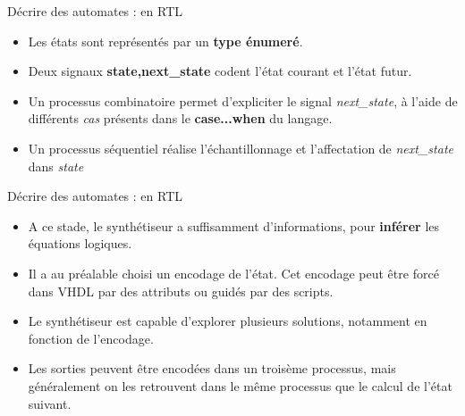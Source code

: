 \begin{frame}{Décrire des automates : en RTL}
  \begin{itemize}
    \item Les états sont représentés par un \textbf{type énumeré}.
    \item Deux signaux \textbf{state,next\_state} codent l'état courant et l'état futur.
    \item Un processus combinatoire permet d'expliciter le signal {\it next\_state}, à l'aide
    de différents {\it cas} présents dans le \textbf{case...when} du langage.
    \item Un processus séquentiel réalise l'échantillonnage et l'affectation de {\it next\_state} dans {\it state}
  \end{itemize}
\end{frame}

\begin{frame}{Décrire des automates : en RTL}
  \begin{itemize}
    \item A ce stade, le synthétiseur a suffisamment d'informations, pour \textbf{inférer} les équations logiques.
    \item Il a au préalable choisi un encodage de l'état. Cet encodage peut être forcé dans VHDL par des attributs ou guidés par des scripts.
    \item Le synthétiseur est capable d'explorer plusieurs solutions, notamment en fonction de l'encodage.
    \item Les sorties peuvent être encodées dans un troisème processus, mais généralement on les retrouvent dans le même processus que le calcul
    de l'état suivant.
  \end{itemize}
\end{frame}

